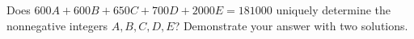 Does $600A+600B+650C+700D+2000E=181000$ uniquely determine the nonnegative integers $A,B,C,D,E$? Demonstrate your answer with two solutions.
